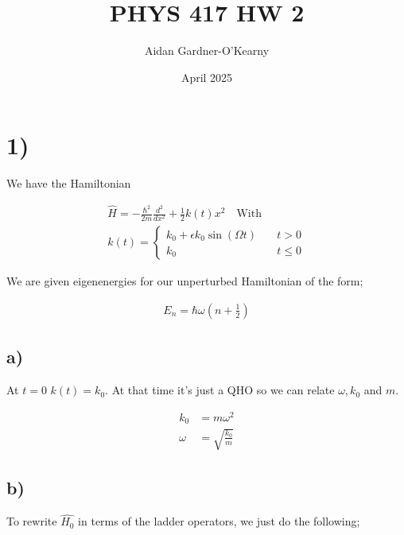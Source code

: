 \documentclass{article}
\title{PHYS 417 HW 2}
\author{Aidan Gardner-O'Kearny}
\date{April 2025}
\newcommand{\p}[1]{\left(#1\right)}
\begin{document}
\maketitle

\section*{1)}

We have the Hamiltonian

\begin{align*}
    \hat{H}=-\frac{\hbar^2}{2m}\frac{d^2}{dx^2}+\frac{1}{2}k(t)x^2\quad\text{With}\\[1em]
    k(t)=\begin{cases}
        k_0+\epsilon{k_0}\sin(\Omega{t})\quad&{t>0}\\[1em]
        k_0\quad&{t\leq0}
    \end{cases}
\end{align*}

We are given eigenenergies for our unperturbed Hamiltonian of the form;

\begin{align*}
    E_{n}=\hbar\omega\p{n+\frac{1}{2}}
\end{align*}

\subsection*{a)}
At $t=0$ $k(t)=k_0$. At that time it's just a QHO so we can relate $\omega, k_0$ and $m$.

\begin{align*}
    k_0&=m\omega^2\\[1em]
    \omega&=\sqrt{\frac{k_0}{m}}
\end{align*}



\subsection*{b)}
To rewrite $\hat{H_0}$ in terms of the ladder operators, we just do the following;
\end{document}
